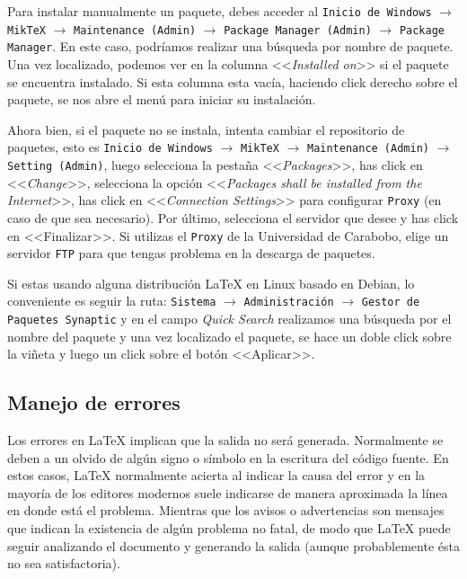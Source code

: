 Para instalar manualmente un paquete, debes acceder al \texttt{Inicio de Windows} $\rightarrow$ \texttt{MikTeX} $\rightarrow$ \texttt{Maintenance (Admin)} $\rightarrow$ \texttt{Package Manager (Admin)} $\rightarrow$ \texttt{Package Manager}. En este caso, podríamos realizar una búsqueda por nombre de paquete. Una vez localizado, podemos ver en la columna <<\textit{Installed on}>> si el paquete se encuentra instalado. Si esta columna esta vacía, haciendo click derecho sobre el paquete, se nos abre el menú para iniciar su instalación.

Ahora bien, si el paquete no se instala, intenta cambiar el repositorio de paquetes, esto es \texttt{Inicio de Windows} $\rightarrow$ \texttt{MikTeX} $\rightarrow$ \texttt{Maintenance (Admin)} $\rightarrow$ \texttt{Setting (Admin)}, luego selecciona la pestaña <<\textit{Packages}>>, has click en <<\textit{Change}>>, selecciona la opción <<\textit{Packages shall be installed from the Internet}>>, has click en <<\textit{Connection Settings}>> para configurar \texttt{Proxy} (en caso de que sea necesario). Por último, selecciona el servidor que desee y has click en <<Finalizar>>. Si utilizas el \texttt{Proxy} de la Universidad de Carabobo, elige un servidor \texttt{FTP} para que tengas problema en la descarga de paquetes.

Si estas usando alguna distribución \LaTeX{} en Linux basado en Debian, lo conveniente es seguir la ruta: \texttt{Sistema}  $\rightarrow$ \texttt{Administración} $\rightarrow$  \texttt{Gestor de Paquetes Synaptic} y en el campo \textit{Quick Search} realizamos una búsqueda por el nombre del paquete y una vez localizado el paquete, se hace un doble click sobre la viñeta y luego un click sobre el botón <<Aplicar>>.

\subsection{Manejo de errores}

Los errores en \LaTeX{} implican que la salida no será generada. Normalmente se deben a un olvido de algún signo o s\'{i}mbolo en la escritura del c\'{o}digo fuente. En estos casos, \LaTeX{} normalmente acierta al indicar la causa del error y en la mayoría de los editores modernos suele indicarse de manera aproximada la l\'{i}nea en donde est\'{a} el problema. Mientras que los avisos o advertencias son mensajes que indican la existencia de algún problema no fatal, de modo que \LaTeX{} puede seguir analizando el documento y
generando la salida (aunque probablemente ésta no sea satisfactoria).

